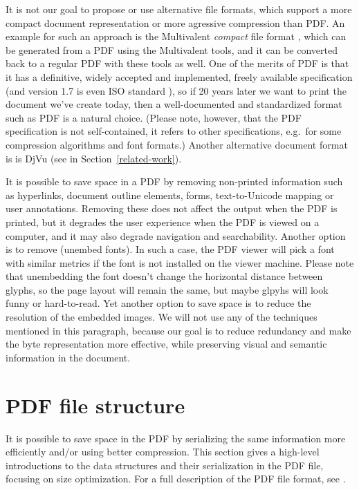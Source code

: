 \documentclass{ltugproc}
\begin{document}
It is not our goal to propose or use
alternative file formats, which support a more
compact document representation or more agressive compression than PDF. An
example for such an approach is the Multivalent \emph{compact} file format
\cite{multivalent-compact}, which can be generated from a PDF using the
Multivalent tools, and it can be converted back to a regular PDF with these
tools as well. One of the merits of PDF is that it has a definitive, widely
accepted and implemented, freely available
specification \cite{pdfref} (and version 1.7 is
even ISO standard \cite{pdf-iso}), so if 20 years later we want to
print the document we've create today, then a well-documented and
standardized format such as PDF is a natural choice. (Please note, however,
that the PDF specification is not self-contained, it refers to other
specifications, e.g.\ for some compression algorithms and font formats.)
Another alternative document format is is DjVu (see in
Section~\ref{related-work}).

It is possible to save space in a PDF by removing non-printed information
such as hyperlinks, document outline elements, forms, text-to-Unicode
mapping or user annotations. Removing these does not affect the output when
the PDF is printed, but it degrades the user experience when the PDF is
viewed on a computer, and it may also degrade navigation and searchability.
Another option is to remove (unembed fonts). In such a case, the PDF viewer
will pick a font with similar metrics if the font is not installed on the
viewer machine. Please note that unembedding the font doesn't change the
horizontal distance between glyphs, so the page layout will remain the
same, but maybe glpyhs will look funny or hard-to-read. Yet another option
to save space is to reduce the resolution of the embedded images. We will
not use any of the techniques mentioned in this paragraph, because our goal
is to reduce redundancy and make the byte representation more effective,
while preserving visual and semantic information in the document.

\section{PDF file structure}

It is possible to save space in the PDF by serializing the same information
more efficiently and/or using better compression. This section gives a
high-level introductions to the data structures and their serialization in
the PDF file, focusing on size optimization. For a full description of the
PDF file format, see \cite{pdfref}.
\end{document}
